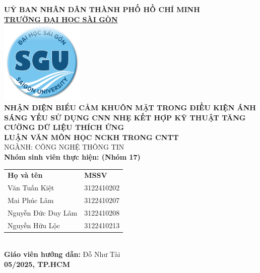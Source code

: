 \begin{titlepage}

    \vspace*{-1cm} 
    \centering

    {\LARGE \textbf{UỶ BAN NHÂN DÂN THÀNH PHỐ HỒ CHÍ MINH}} \\[0.5cm] %
    {\Large \textbf{\underline{TRƯỜNG ĐẠI HỌC SÀI GÒN}}} \\[1cm]

    \includegraphics[width=4cm]{./img/logo.png} \\[1cm]

    {\huge \textbf{NHẬN DIỆN BIỂU CẢM KHUÔN MẶT TRONG ĐIỀU KIỆN ÁNH SÁNG YẾU SỬ DỤNG CNN NHẸ KẾT HỢP KỸ THUẬT TĂNG CƯỜNG DỮ LIỆU THÍCH ỨNG}} \\[1.5cm]

    {\Large \textbf{LUẬN VĂN MÔN HỌC NCKH TRONG CNTT}} \\[0.5cm]
    {\Large NGÀNH: CÔNG NGHỆ THÔNG TIN} \\[1cm]

    \textbf{Nhóm sinh viên thực hiện: (Nhóm 17)} \\[0.5cm]
    \begin{tabular}{l l}
        \textbf{Họ và tên} & \textbf{MSSV} \\ 
        Văn Tuấn Kiệt & 3122410202 \\ 
        Mai Phúc Lâm & 3122410207 \\ 
        Nguyễn Đức Duy Lâm & 3122410208 \\ 
        Nguyễn Hữu Lộc & 3122410213 \\ 
    \end{tabular}
    \\[1cm]  %
    \textbf{Giáo viên hướng dẫn:} Đỗ Như Tài \\[0.5cm]
    \textbf{ 05/2025, TP.HCM }
\end{titlepage}